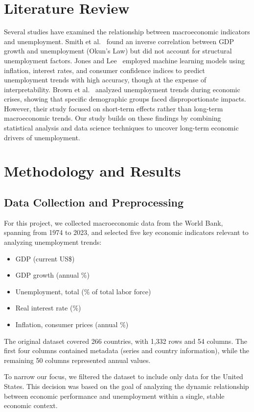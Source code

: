 \documentclass[conference]{IEEEtran}
\begin{document}
\section{Literature Review}
Several studies have examined the relationship between macroeconomic indicators and unemployment. Smith et al.~\cite{smith2021economic} found an inverse correlation between GDP growth and unemployment (Okun’s Law) but did not account for structural unemployment factors. Jones and Lee~\cite{jones2019predicting} employed machine learning models using inflation, interest rates, and consumer confidence indices to predict unemployment trends with high accuracy, though at the expense of interpretability. Brown et al.~\cite{brown2022unemployment} analyzed unemployment trends during economic crises, showing that specific demographic groups faced disproportionate impacts. However, their study focused on short-term effects rather than long-term macroeconomic trends. Our study builds on these findings by combining statistical analysis and data science techniques to uncover long-term economic drivers of unemployment.

\section{Methodology and Results}
\subsection{Data Collection and Preprocessing}

For this project, we collected macroeconomic data from the World Bank, spanning from 1974 to 2023, and selected five key economic indicators relevant to analyzing unemployment trends:
\begin{itemize}
    \item GDP (current US\$)
    \item GDP growth (annual \%)
    \item Unemployment, total (\% of total labor force)
    \item Real interest rate (\%)
    \item Inflation, consumer prices (annual \%)
\end{itemize}

The original dataset covered 266 countries, with 1,332 rows and 54 columns. The first four columns contained metadata (series and country information), while the remaining 50 columns represented annual values.

To narrow our focus, we filtered the dataset to include only data for the United States. This decision was based on the goal of analyzing the dynamic relationship between economic performance and unemployment within a single, stable economic context.
\end{document}

